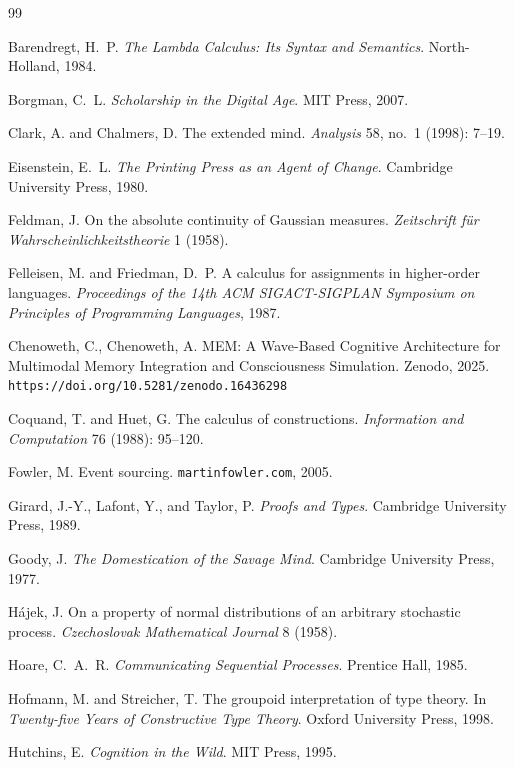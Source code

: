 \documentclass[12pt, a4paper, openany]{book}
\theoremstyle{plain}
\theoremstyle{definition}
\theoremstyle{remark}
\begin{document}
\begin{thebibliography}{99}

Barendregt, H.~P. \emph{The Lambda Calculus: Its Syntax and Semantics}.
North-Holland, 1984.

Borgman, C.~L. \emph{Scholarship in the Digital Age}. MIT Press, 2007.

Clark, A. and Chalmers, D. The extended mind. \emph{Analysis} 58, no.~1 (1998):
7--19.

Eisenstein, E.~L. \emph{The Printing Press as an Agent of Change}. Cambridge
University Press, 1980.

Feldman, J. On the absolute continuity of Gaussian measures. \emph{Zeitschrift
f\"ur Wahrscheinlichkeitstheorie} 1 (1958).

Felleisen, M. and Friedman, D.~P. A calculus for assignments in higher-order
languages. \emph{Proceedings of the 14th ACM SIGACT-SIGPLAN Symposium on
Principles of Programming Languages}, 1987.


Chenoweth, C., Chenoweth, A.
MEM: A Wave-Based Cognitive Architecture for Multimodal Memory Integration
and Consciousness Simulation. Zenodo, 2025.
\texttt{https://doi.org/10.5281/zenodo.16436298}

Coquand, T. and Huet, G. The calculus of constructions.
\emph{Information and Computation} 76 (1988): 95--120.

Fowler, M. Event sourcing. \texttt{martinfowler.com}, 2005.

Girard, J.-Y., Lafont, Y., and Taylor, P. \emph{Proofs and Types}. Cambridge
University Press, 1989.

Goody, J. \emph{The Domestication of the Savage Mind}. Cambridge University
Press, 1977.

H\'ajek, J. On a property of normal distributions of an arbitrary stochastic
process. \emph{Czechoslovak Mathematical Journal} 8 (1958).

Hoare, C.~A.~R. \emph{Communicating Sequential Processes}. Prentice Hall, 1985.

Hofmann, M. and Streicher, T. The groupoid interpretation of type theory.
In \emph{Twenty-five Years of Constructive Type Theory}. Oxford University Press,
1998.

Hutchins, E. \emph{Cognition in the Wild}. MIT Press, 1995.


\end{thebibliography}
\end{document}

